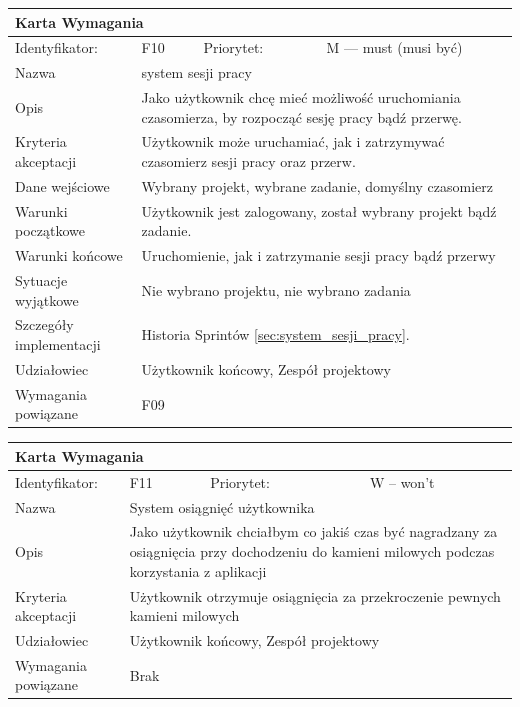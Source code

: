 \documentclass[a4paper,11pt]{report}
\begin{document}
		\begin{tabular}{|p{3cm}|p{2cm}|p{2cm}|p{6cm}|}
		\hline
		\multicolumn{4}{|p{12 cm}|}{Karta Wymagania}\\
		\hline
		Identyfikator: & F10 & Priorytet: & M — must (musi być)\\
		\hline
		Nazwa & \multicolumn{3}{|p{10 cm}|}{system sesji pracy}\\
		\hline
		Opis & \multicolumn{3}{|p{10 cm}|}{Jako użytkownik chcę mieć możliwość uruchomiania czasomierza, by rozpocząć sesję pracy bądź przerwę.}\\
		\hline
		Kryteria akceptacji & \multicolumn{3}{|p{10 cm}|}{Użytkownik może uruchamiać, jak i zatrzymywać czasomierz sesji pracy oraz przerw.}\\
		\hline
		Dane wejściowe & \multicolumn{3}{|p{10 cm}|}{Wybrany projekt, wybrane zadanie, domyślny czasomierz}\\
		\hline
		Warunki początkowe & \multicolumn{3}{|p{10 cm}|}{Użytkownik jest zalogowany, został wybrany projekt bądź zadanie.}\\
		\hline
		Warunki końcowe & \multicolumn{3}{|p{10 cm}|}{Uruchomienie, jak i zatrzymanie sesji pracy bądź przerwy}\\
		\hline
		Sytuacje wyjątkowe & \multicolumn{3}{|p{10 cm}|}{Nie wybrano projektu, nie wybrano zadania}\\
		\hline
		Szczegóły implementacji & \multicolumn{3}{|p{10 cm}|}{Historia Sprintów \ref{sec:system_sesji_pracy}.}\\
		\hline
		Udziałowiec & \multicolumn{3}{|p{10 cm}|}{Użytkownik końcowy, Zespół projektowy}\\
		\hline
		Wymagania powiązane & \multicolumn{3}{|p{10 cm}|}{F09}\\
		\hline
		\end{tabular}
		\newline
		\vspace*{0,2 cm}
		\newline
		\begin{tabular}{|p{3cm}|p{2cm}|p{2cm}|p{6cm}|}
		\hline
		\multicolumn{4}{|p{12 cm}|}{Karta Wymagania}\\
		\hline
		Identyfikator: & F11 & Priorytet: & W – won't \\
		\hline
		Nazwa & \multicolumn{3}{|p{10 cm}|}{System osiągnięć użytkownika}\\
		\hline
		Opis & \multicolumn{3}{|p{10 cm}|}{Jako użytkownik chciałbym co jakiś czas być nagradzany za osiągnięcia przy dochodzeniu do kamieni milowych podczas korzystania z aplikacji}\\
		\hline
		Kryteria akceptacji & \multicolumn{3}{|p{10 cm}|}{Użytkownik otrzymuje osiągnięcia za przekroczenie pewnych kamieni milowych}\\
		\hline
		Udziałowiec & \multicolumn{3}{|p{10 cm}|}{Użytkownik końcowy, Zespół projektowy}\\
		\hline
		Wymagania powiązane & \multicolumn{3}{|p{10 cm}|}{Brak}\\
		\hline
		\end{tabular}
\end{document}

